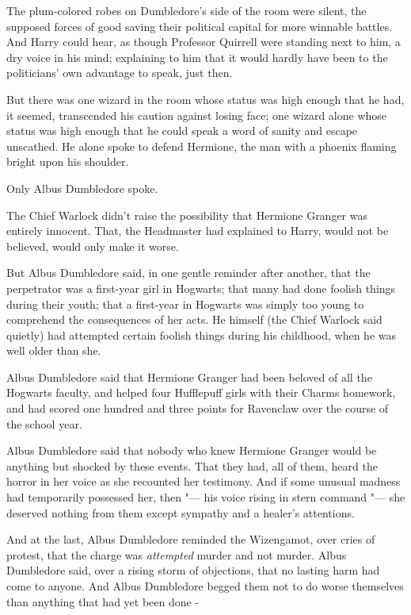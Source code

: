 The plum-colored robes on Dumbledore's side of the room were silent, the
supposed forces of good saving their political capital for more winnable
battles. And Harry could hear, as though Professor Quirrell were
standing next to him, a dry voice in his mind; explaining to him that it
would hardly have been to the politicians' own advantage to speak, just
then.

But there was one wizard in the room whose status was high enough that
he had, it seemed, transcended his caution against losing face; one
wizard alone whose status was high enough that he could speak a word of
sanity and escape unscathed. He alone spoke to defend Hermione, the man
with a phoenix flaming bright upon his shoulder.

Only Albus Dumbledore spoke.

The Chief Warlock didn't raise the possibility that Hermione Granger was
entirely innocent. That, the Headmaster had explained to Harry, would
not be believed, would only make it worse.

But Albus Dumbledore said, in one gentle reminder after another, that
the perpetrator was a first-year girl in Hogwarts; that many had done
foolish things during their youth; that a first-year in Hogwarts was
simply too young to comprehend the consequences of her acts. He himself
(the Chief Warlock said quietly) had attempted certain foolish things
during his childhood, when he was well older than she.

Albus Dumbledore said that Hermione Granger had been beloved of all the
Hogwarts faculty, and helped four Hufflepuff girls with their Charms
homework, and had scored one hundred and three points for Ravenclaw over
the course of the school year.

Albus Dumbledore said that nobody who knew Hermione Granger would be
anything but shocked by these events. That they had, all of them, heard
the horror in her voice as she recounted her testimony. And if some
unusual madness had temporarily possessed her, then "--- his voice rising
in stern command "--- she deserved nothing from them except sympathy and a
healer's attentions.

And at the last, Albus Dumbledore reminded the Wizengamot, over cries of
protest, that the charge was \emph{attempted} murder and not murder.
Albus Dumbledore said, over a rising storm of objections, that no
lasting harm had come to anyone. And Albus Dumbledore begged them not to
do worse themselves than anything that had yet been done -

